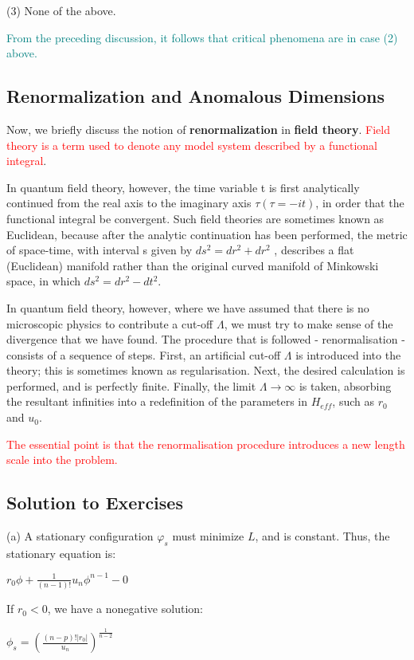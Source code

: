 \documentclass[12pt,titlepage]{article}
\newcommand{\redp}[1]{\textcolor{red}{#1}}
\newcommand{\tealp}[1]{\textcolor{teal}{#1}}
\numberwithin{equation}{section}
\begin{document}
(3) None of the above.

\tealp{From the preceding discussion, it follows that critical phenomena are in case (2) above.}

\subsection{Renormalization and Anomalous Dimensions}
Now, we briefly discuss the notion of \textbf{renormalization} in \textbf{field theory}. \redp{Field theory is a term used to denote any model system described by a functional integral}.

In quantum field theory, however, the time variable t is first analytically continued from the real axis to the imaginary axis $\tau ( \tau = -it)$, in order that the functional integral be convergent. Such field theories are sometimes known as Euclidean, because after the analytic continuation has been performed, the metric of space-time, with interval s given by $ds^2 = dr^2 + dr^2$ , describes a flat (Euclidean) manifold rather than the original curved manifold of Minkowski space, in which $ds^2 = dr^2 - dt^2$.

In quantum field theory, however, where we have assumed that there is no microscopic physics to contribute a cut-off $\Lambda$, we must try to make sense of the divergence that we have found. The procedure that is followed - renormalisation - consists of a sequence of steps. First, an artificial cut-off $\Lambda$ is introduced into the theory; this is sometimes known as regularisation. Next, the desired calculation is performed, and is perfectly finite. Finally, the limit $\Lambda\rightarrow \infty$ is taken, absorbing the resultant infinities into a redefinition of the parameters in $H_{eff}$, such as $r_0$ and $u_0$.

\redp{The essential point is that the renormalisation
procedure introduces a new length scale into the problem.}

\subsection{Solution to Exercises}
(a) A stationary configuration $\varphi_s$ must minimize $L$, and is constant. Thus, the stationary equation is:

$r_{0} \phi+\frac{1}{(n-1) !} u_{n} \phi^{n-1}-0$

If $r_0<0$, we have a nonegative solution:

$\phi_{s}=\left(\frac{(n-p) !\left|r_{0}\right|}{u_{n}}\right)^{\frac{1}{n-2}}$
\end{document}
